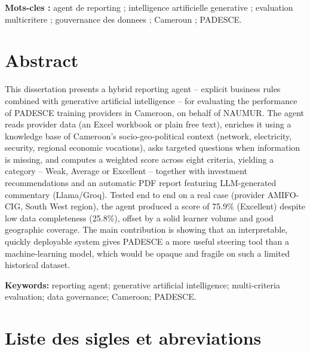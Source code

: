 \documentclass[12pt,a4paper,twoside,openany]{report}
\begin{document}
\textbf{Mots-cles :} agent de reporting ; intelligence artificielle generative ; evaluation multicritere ; gouvernance des donnees ; Cameroun ; PADESCE.

\newpage


\chapter*{Abstract}

{\setlength{\parskip}{0pt}
This dissertation presents a hybrid reporting agent -- explicit business rules combined with generative artificial intelligence -- for evaluating the performance of PADESCE training providers in Cameroon, on behalf of NAUMUR. The agent reads provider data (an Excel workbook or plain free text), enriches it using a knowledge base of Cameroon's socio-geo-political context (network, electricity, security, regional economic vocations), asks targeted questions when information is missing, and computes a weighted score across eight criteria, yielding a category -- Weak, Average or Excellent -- together with investment recommendations and an automatic PDF report featuring LLM-generated commentary (Llama/Groq).
Tested end to end on a real case (provider AMIFO-CIG, South West region), the agent produced a score of 75.9\% (Excellent) despite low data completeness (25.8\%), offset by a solid learner volume and good geographic coverage. The main contribution is showing that an interpretable, quickly deployable system gives PADESCE a more useful steering tool than a machine-learning model, which would be opaque and fragile on such a limited historical dataset.
}

\textbf{Keywords:} reporting agent; generative artificial intelligence; multi-criteria evaluation; data governance; Cameroon; PADESCE.

\newpage


\listoftables
\newpage
\listoffigures
\newpage


\chapter*{Liste des sigles et abreviations}
\end{document}
